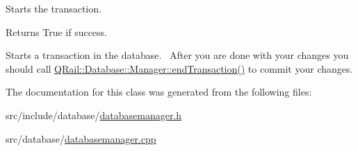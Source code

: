 Starts the transaction. 

\begin{DoxyReturn}{Returns}
True if success.
\end{DoxyReturn}
Starts a transaction in the database.~\newline
 After you are done with your changes you should call \mbox{\hyperlink{classQRail_1_1Database_1_1Manager_a027f3ec1350204386c5328ec8628b276}{Q\+Rail\+::\+Database\+::\+Manager\+::end\+Transaction()}} to commit your changes. 

The documentation for this class was generated from the following files\+:\begin{DoxyCompactItemize}
\item 
src/include/database/\mbox{\hyperlink{databasemanager_8h}{databasemanager.\+h}}\item 
src/database/\mbox{\hyperlink{databasemanager_8cpp}{databasemanager.\+cpp}}\end{DoxyCompactItemize}

